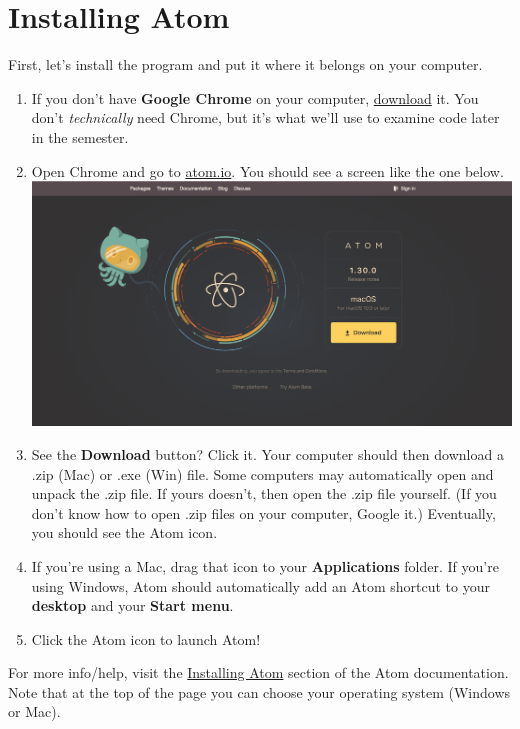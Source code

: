 \documentclass[]{book}
\providecommand{\tightlist}{%
  \setlength{\itemsep}{0pt}\setlength{\parskip}{0pt}}
\theoremstyle{definition}
\theoremstyle{definition}
\theoremstyle{definition}
\theoremstyle{remark}
\begin{document}
\hypertarget{installing-atom}{%
\section{Installing Atom}\label{installing-atom}}

First, let's install the program and put it where it belongs on your
computer.

\begin{enumerate}
\def\labelenumi{\arabic{enumi}.}
\tightlist
\item
  If you don't have \textbf{Google Chrome} on your computer,
  \href{https://support.google.com/chrome/answer/95346?co=GENIE.Platform\%3DDesktop\&hl=en}{download}
  it. You don't \emph{technically} need Chrome, but it's what we'll use
  to examine code later in the semester.
\item
  Open Chrome and go to \href{https://atom.io/}{atom.io}. You should see
  a screen like the one below.\\
  \includegraphics{atom-getting-started.png}
\item
  See the \textbf{Download} button? Click it. Your computer should then
  download a .zip (Mac) or .exe (Win) file. Some computers may
  automatically open and unpack the .zip file. If yours doesn't, then
  open the .zip file yourself. (If you don't know how to open .zip files
  on your computer, Google it.) Eventually, you should see the Atom
  icon.
\item
  If you're using a Mac, drag that icon to your \textbf{Applications}
  folder. If you're using Windows, Atom should automatically add an Atom
  shortcut to your \textbf{desktop} and your \textbf{Start menu}.~
\item
  Click the Atom icon to launch Atom!
\end{enumerate}

For more info/help, visit the
\href{http://flight-manual.atom.io/getting-started/sections/installing-atom/\#platform-mac}{Installing
Atom} section of the Atom documentation. Note that at the top of the
page you can choose your operating system (Windows or Mac).
\end{document}
